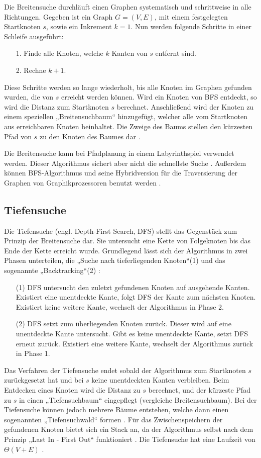 Die Breitensuche durchläuft einen Graphen systematisch und schrittweise in alle Richtungen. Gegeben ist ein Graph $G = (V, E)$, mit einem festgelegten Startknoten $s$, sowie ein Inkrement $k=1$. Nun werden folgende Schritte in einer Schleife ausgeführt:
\begin{itemize}
\item[1.] Finde alle Knoten, welche $k$ Kanten von $s$ entfernt sind.
\item[2.] Rechne $k + 1$.
\end{itemize}
Diese Schritte werden so lange wiederholt, bis alle Knoten im Graphen gefunden wurden, die von $s$ erreicht werden können. Wird ein Knoten von BFS entdeckt, so wird die Distanz zum Startknoten $s$ berechnet. Anschließend wird der Knoten zu einem speziellen „Breitensuchbaum“ hinzugefügt, welcher alle vom Startknoten aus erreichbaren Knoten beinhaltet. Die Zweige des Baums stellen den kürzesten Pfad von $s$ zu den Knoten des Baumes dar \cite[S.594]{Cormen.2009}.

Die Breitensuche kann bei Pfadplanung in einem Labyrinthspiel verwendet werden. Dieser Algorithmus sichert aber nicht die schnellste Suche \cite{PBAS18}. Außerdem können BFS-Algorithmus und seine Hybridversion \cite{HT13} für die Traversierung der Graphen von Graphikprozessoren benutzt werden \cite{MGG12}.

\subsection{Tiefensuche}

Die Tiefensuche (engl. Depth-First Search, DFS) stellt das Gegenstück zum Prinzip der Breitensuche dar. Sie untersucht eine Kette von Folgeknoten bis das Ende der Kette erreicht wurde. Grundlegend lässt sich der Algorithmus in zwei Phasen unterteilen, die „Suche nach tieferliegenden Knoten“(1) und das sogenannte „Backtracking“(2) \cite{Tarjan.1972}:
\begin{itemize}
	\item[(1)] DFS untersucht den zuletzt gefundenen Knoten auf ausgehende Kanten. Existiert eine unentdeckte Kante, folgt DFS der Kante zum nächsten Knoten. Existiert keine weitere Kante, wechselt der Algorithmus in Phase 2.
	\item[(2)] DFS setzt zum überliegenden Knoten zurück. Dieser wird auf eine unentdeckte Kante untersucht. Gibt es keine unentdeckte Kante, setzt DFS erneut zurück. Existiert eine weitere Kante, wechselt der Algorithmus zurück in Phase 1.	
\end{itemize}
Das Verfahren der Tiefensuche endet sobald der Algorithmus zum Startknoten $s$ zurückgesetzt hat und bei $s$ keine unentdeckten Kanten verbleiben. Beim Entdecken eines Knoten wird die Distanz zu $s$ berechnet, und der kürzeste Pfad zu $s$ in einen „Tiefensuchbaum“ eingepflegt (vergleiche Breitensuchbaum). Bei der Tiefensuche können jedoch mehrere Bäume entstehen, welche dann einen sogenannten „Tiefensuchwald“ formen \cite[S.603]{Cormen.2009}.
Für das Zwischenspeichern der gefundenen Knoten bietet sich ein Stack an, da der Algorithmus selbst nach dem Prinzip „Last In - First Out“ funktioniert \cite{Tarjan.1972}. Die Tiefensuche hat eine Laufzeit von $\Theta(V + E)$ \cite[S.606]{Cormen.2009}.

